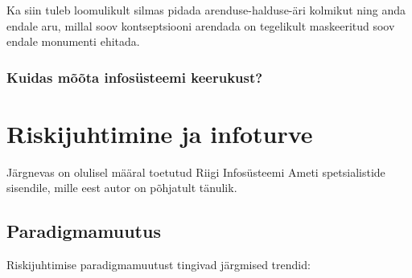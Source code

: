 \documentclass{tufte-book}
\begin{document}
Ka siin tuleb loomulikult silmas pidada arenduse-halduse-äri kolmikut ning anda endale aru, millal soov kontseptsiooni arendada on tegelikult maskeeritud soov endale monumenti ehitada.
\subsection{Kuidas mõõta infosüsteemi keerukust?}


\chapter{Riskijuhtimine ja infoturve}
Järgnevas on olulisel määral toetutud Riigi Infosüsteemi Ameti spetsialistide sisendile, mille eest autor on põhjatult tänulik.

\section{Paradigmamuutus}
Riskijuhtimise paradigmamuutust tingivad järgmised trendid:
\end{document}
